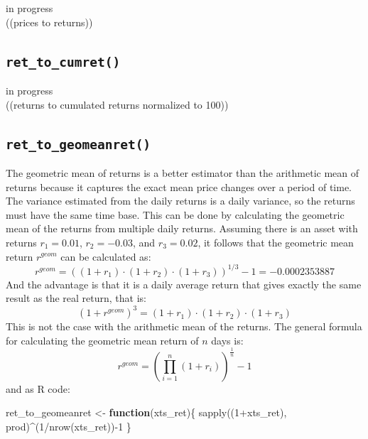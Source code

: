 \documentclass[
  oneside]{book}
\newenvironment{Shaded}{\begin{snugshade}}{\end{snugshade}}
\newcommand{\ControlFlowTok}[1]{\textcolor[rgb]{0.13,0.29,0.53}{\textbf{#1}}}
\newcommand{\DecValTok}[1]{\textcolor[rgb]{0.00,0.00,0.81}{#1}}
\newcommand{\FunctionTok}[1]{\textcolor[rgb]{0.00,0.00,0.00}{#1}}
\newcommand{\NormalTok}[1]{#1}
\newcommand{\OtherTok}[1]{\textcolor[rgb]{0.56,0.35,0.01}{#1}}
\newcommand{\SpecialCharTok}[1]{\textcolor[rgb]{0.00,0.00,0.00}{#1}}
\begin{document}
\textbar\textbar\textbar in progress\textbar\textbar\textbar{}\\
((prices to returns))

\hypertarget{ret_to_cumret}{%
\subsection{\texorpdfstring{\texttt{ret\_to\_cumret()}}{ret\_to\_cumret()}}\label{ret_to_cumret}}

\textbar\textbar\textbar in progress\textbar\textbar\textbar{}\\
((returns to cumulated returns normalized to 100))

\hypertarget{geomeanret}{%
\subsection{\texorpdfstring{\texttt{ret\_to\_geomeanret()}}{ret\_to\_geomeanret()}}\label{geomeanret}}

The geometric mean of returns is a better estimator than the arithmetic mean of returns because it captures the exact mean price changes over a period of time. The variance estimated from the daily returns is a daily variance, so the returns must have the same time base. This can be done by calculating the geometric mean of the returns from multiple daily returns. Assuming there is an asset with returns \(r_1 = 0.01\), \(r_2=-0.03\), and \(r_3=0.02\), it follows that the geometric mean return \(r^{geom}\) can be calculated as:
\[
  r^{geom} = ((1+r_1) \cdot (1+r_2) \cdot (1+r_3))^{1/3}-1 = -0.0002353887
\]
And the advantage is that it is a daily average return that gives exactly the same result as the real return, that is:
\[
  (1+r^{geom})^3 = (1+r_1) \cdot (1+r_2) \cdot (1+r_3)
\]
This is not the case with the arithmetic mean of the returns. The general formula for calculating the geometric mean return of \(n\) days is:
\[
  r^{geom} = (\prod_{i=1}^n (1+r_i))^{\frac{1}{n}}-1
\]
and as R code:

\begin{Shaded}
\begin{Highlighting}[]
\NormalTok{ret\_to\_geomeanret }\OtherTok{\textless{}{-}} \ControlFlowTok{function}\NormalTok{(xts\_ret)\{}
  \FunctionTok{sapply}\NormalTok{((}\DecValTok{1}\SpecialCharTok{+}\NormalTok{xts\_ret), prod)}\SpecialCharTok{\^{}}\NormalTok{(}\DecValTok{1}\SpecialCharTok{/}\FunctionTok{nrow}\NormalTok{(xts\_ret))}\SpecialCharTok{{-}}\DecValTok{1}
\NormalTok{\}}
\end{Highlighting}
\end{Shaded}
\end{document}
